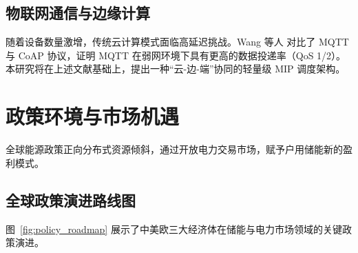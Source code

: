 \subsection{物联网通信与边缘计算}
随着设备数量激增，传统云计算模式面临高延迟挑战。Wang 等人 \cite{wang2022mqtt} 对比了 MQTT 与 CoAP 协议，证明 MQTT 在弱网环境下具有更高的数据投递率（QoS 1/2）。
本研究将在上述文献基础上，提出一种“云-边-端”协同的轻量级 MIP 调度架构。

\section{政策环境与市场机遇}
全球能源政策正向分布式资源倾斜，通过开放电力交易市场，赋予户用储能新的盈利模式。

\subsection{全球政策演进路线图}
图~\ref{fig:policy_roadmap} 展示了中美欧三大经济体在储能与电力市场领域的关键政策演进。

